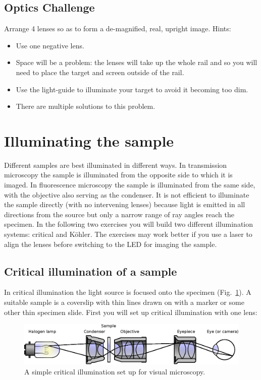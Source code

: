 \documentclass[a4paper]{report}
\begin{document}
\subsection{Optics Challenge}
Arrange 4 lenses so as to form a de-magnified, real, upright
image. Hints: 
\begin{itemize}
\item Use one negative lens.
\item Space will be a problem: the lenses will take up the whole rail
  and so you will need to place the target and screen outside of the
  rail. 
\item Use the light-guide to illuminate your target to avoid it
  becoming too dim. 
\item There are multiple solutions to this problem.
\end{itemize}


\clearpage
\section{Illuminating the sample}
Different samples are best illuminated in different ways.
In transmission microscopy the sample is illuminated from the opposite side to which it is imaged. 
In fluorescence microscopy the sample is illuminated from the same side, with the objective also serving as the condenser. 
It is not efficient to illuminate the sample directly (with no intervening lenses) because light is emitted in all directions from the source but only a narrow range of ray angles reach the specimen. 
In the following two exercises you will build two different illumination systems: critical and K\"{o}hler. 
The exercises may work better if you use a laser to align the lenses before switching to the LED for imaging the sample. 


\subsection{Critical illumination of a sample}
In critical illumination the light source is focused onto the specimen (Fig.~\ref{critIlum}).
A suitable sample is a coverslip with thin lines drawn on with a marker or some other thin specimen slide.
First you will set up critical illumination with one lens:


\begin{figure}[h]
\center
\includegraphics[width=5in]{Critical_Illumination.eps}
\caption{A simple critical illumination set up for visual microscopy.}
\label{critIlum}
\end{figure}
\end{document}
